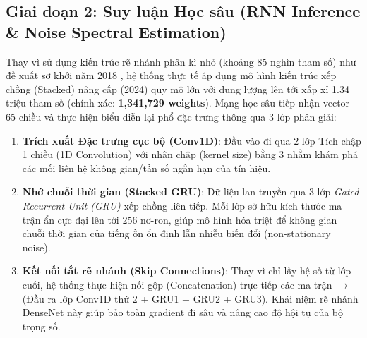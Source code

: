 \subsection{Giai đoạn 2: Suy luận Học sâu (RNN Inference \& Noise Spectral Estimation)}
Thay vì sử dụng kiến trúc rẽ nhánh phân kì nhỏ (khoảng 85 nghìn tham số) như đề xuất sơ khởi năm 2018 \cite{valin2018hybrid}, hệ thống thực tế áp dụng mô hình kiến trúc xếp chồng (Stacked) nâng cấp (2024) quy mô lớn với dung lượng lên tới xấp xỉ 1.34 triệu tham số (chính xác: \textbf{1,341,729 weights}). Mạng học sâu tiếp nhận vector 65 chiều và thực hiện biểu diễn lại phổ đặc trưng thông qua 3 lớp phân giải:
\begin{enumerate}
    \item \textbf{Trích xuất Đặc trưng cục bộ (Conv1D)}: Đầu vào đi qua 2 lớp Tích chập 1 chiều (1D Convolution) với nhân chập (kernel size) bằng 3 nhằm khám phá các mối liên hệ không gian/tần số ngắn hạn của tín hiệu.
    \item \textbf{Nhớ chuỗi thời gian (Stacked GRU)}: Dữ liệu lan truyền qua 3 lớp \textit{Gated Recurrent Unit (GRU)} xếp chồng liên tiếp. Mỗi lớp sở hữu kích thước ma trận ẩn cực đại lên tới 256 nơ-ron, giúp mô hình hóa triệt để không gian chuỗi thời gian của tiếng ồn ổn định lẫn nhiễu biến đổi (non-stationary noise).
    \item \textbf{Kết nối tắt rẽ nhánh (Skip Connections)}: Thay vì chỉ lấy hệ số từ lớp cuối, hệ thống thực hiện nối gộp (Concatenation) trực tiếp các ma trận $\rightarrow$ (Đầu ra lớp Conv1D thứ 2 + GRU1 + GRU2 + GRU3). Khái niệm rẽ nhánh DenseNet này giúp bảo toàn gradient đi sâu và nâng cao độ hội tụ của bộ trọng số.
\end{enumerate}

